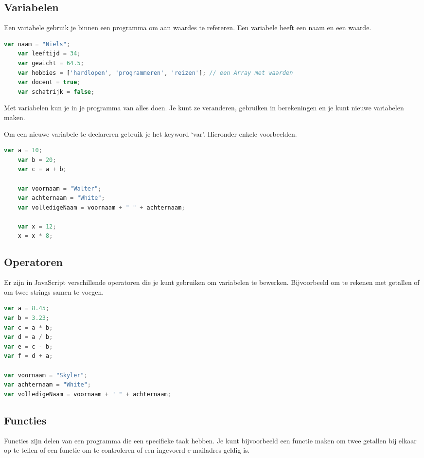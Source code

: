 \documentclass[8pt,pagesize,footinclude=false,headinclude=false]{scrartcl}
\begin{document}
\begin{multicols*}{3}
\subsection*{Variabelen}
Een variabele gebruik je binnen een programma om aan waardes te refereren. Een variabele heeft een naam en een waarde.
\begin{lstlisting}[language=javascript]
	var naam = "Niels";
	var leeftijd = 34;
	var gewicht = 64.5;
	var hobbies = ['hardlopen', 'programmeren', 'reizen']; // een Array met waarden
	var docent = true;
	var schatrijk = false;
\end{lstlisting}

\noindent Met variabelen kun je in je programma van alles doen. Je kunt ze veranderen, gebruiken in berekeningen en je kunt nieuwe variabelen maken.

Om een nieuwe variabele te declareren gebruik je het keyword `var'. Hieronder enkele voorbeelden.
\begin{lstlisting}[language=javascript]
	var a = 10;
	var b = 20;
	var c = a + b;
	
	var voornaam = "Walter";
	var achternaam = "White";
	var volledigeNaam = voornaam + " " + achternaam;
	
	var x = 12;
	x = x * 8;
\end{lstlisting}

\subsection*{Operatoren}
Er zijn in JavaScript verschillende operatoren die je kunt gebruiken om variabelen te bewerken. Bijvoorbeeld om te rekenen met getallen of om twee strings samen te voegen.
\begin{lstlisting}[language=javascript]
var a = 8.45;
var b = 3.23;
var c = a * b;
var d = a / b;
var e = c - b;
var f = d + a;

var voornaam = "Skyler";
var achternaam = "White";
var volledigeNaam = voornaam + " " + achternaam;
\end{lstlisting}

\subsection*{Functies}
Functies zijn delen van een programma die een specifieke taak hebben. Je kunt bijvoorbeeld een functie maken om twee getallen bij elkaar op te tellen of een functie om te controleren of een ingevoerd e-mailadres geldig is.


\end{multicols*}
\end{document}
